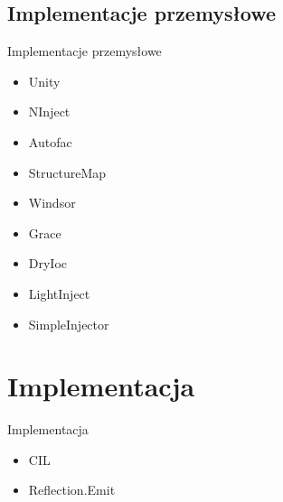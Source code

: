 \documentclass{beamer}
\begin{document}
\subsection*{Implementacje przemysłowe}

\begin{frame}{Implementacje przemysłowe}
\begin{itemize}
	\item Unity
	\item NInject
	\item Autofac
	\item StructureMap
	\item Windsor
	\item Grace
	\item DryIoc
	\item LightInject
	\item SimpleInjector
\end{itemize}
\end{frame}



\section{Implementacja}
\begin{frame}{Implementacja}
\begin{itemize}
	\item CIL
	\item Reflection.Emit
\end{itemize}
\end{frame}
\end{document}
